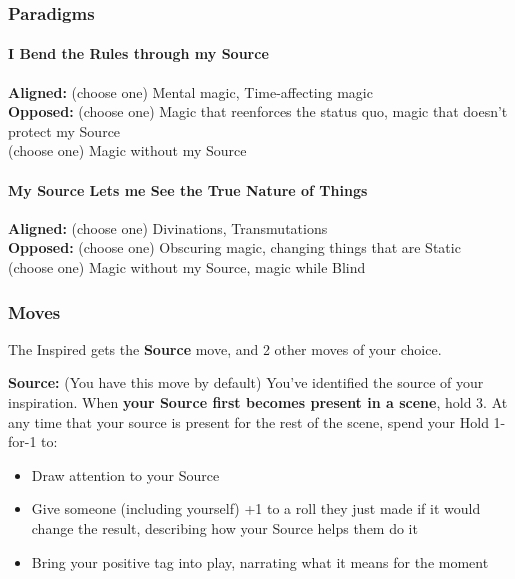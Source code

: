 \documentclass[
]{article}
\providecommand{\tightlist}{%
  \setlength{\itemsep}{0pt}\setlength{\parskip}{0pt}}
\begin{document}
\hypertarget{paradigms-3}{%
\subsubsection{Paradigms}\label{paradigms-3}}

\hypertarget{i-bend-the-rules-through-my-source}{%
\paragraph{I Bend the Rules through my
Source}\label{i-bend-the-rules-through-my-source}}

\textbf{Aligned:} (choose one) Mental magic, Time-affecting magic\\
\textbf{Opposed:} (choose one) Magic that reenforces the status quo,
magic that doesn't protect my Source\\
(choose one) Magic without my Source

\hypertarget{my-source-lets-me-see-the-true-nature-of-things}{%
\paragraph{My Source Lets me See the True Nature of
Things}\label{my-source-lets-me-see-the-true-nature-of-things}}

\textbf{Aligned:} (choose one) Divinations, Transmutations\\
\textbf{Opposed:} (choose one) Obscuring magic, changing things that are
Static\\
(choose one) Magic without my Source, magic while Blind

\hypertarget{moves-3}{%
\subsubsection{Moves}\label{moves-3}}

The Inspired gets the \textbf{Source} move, and 2 other moves of your
choice.

\textbf{Source:} (You have this move by default) You've identified the
source of your inspiration. When \textbf{your Source first becomes
present in a scene}, hold 3. At any time that your source is present for
the rest of the scene, spend your Hold 1-for-1 to:

\begin{itemize}
\tightlist
\item
  Draw attention to your Source
\item
  Give someone (including yourself) +1 to a roll they just made if it
  would change the result, describing how your Source helps them do it
\item
  Bring your positive tag into play, narrating what it means for the
  moment
\end{itemize}
\end{document}
